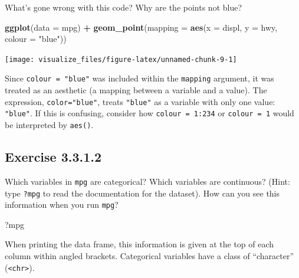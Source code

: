 \documentclass[]{book}
\newenvironment{Shaded}{\begin{snugshade}}{\end{snugshade}}
\newcommand{\DataTypeTok}[1]{\textcolor[rgb]{0.13,0.29,0.53}{#1}}
\newcommand{\KeywordTok}[1]{\textcolor[rgb]{0.13,0.29,0.53}{\textbf{#1}}}
\newcommand{\NormalTok}[1]{#1}
\newcommand{\OperatorTok}[1]{\textcolor[rgb]{0.81,0.36,0.00}{\textbf{#1}}}
\newcommand{\StringTok}[1]{\textcolor[rgb]{0.31,0.60,0.02}{#1}}
\theoremstyle{plain}
\theoremstyle{remark}
\begin{document}
What's gone wrong with this code? Why are the points not blue?

\begin{Shaded}
\begin{Highlighting}[]
\KeywordTok{ggplot}\NormalTok{(}\DataTypeTok{data =}\NormalTok{ mpg) }\OperatorTok{+}
\StringTok{  }\KeywordTok{geom_point}\NormalTok{(}\DataTypeTok{mapping =} \KeywordTok{aes}\NormalTok{(}\DataTypeTok{x =}\NormalTok{ displ, }\DataTypeTok{y =}\NormalTok{ hwy, }\DataTypeTok{colour =} \StringTok{"blue"}\NormalTok{))}
\end{Highlighting}
\end{Shaded}

\begin{center}\texttt{[image: visualize\_files/figure-latex/unnamed-chunk-9-1]} \end{center}

Since \texttt{colour\ =\ "blue"} was included within the \texttt{mapping} argument, it was treated as an aesthetic (a mapping between a variable and a value).
The expression, \texttt{color="blue"}, treats \texttt{"blue"} as a variable with only one value: \texttt{"blue"}. If this is confusing, consider how \texttt{colour\ =\ 1:234} or \texttt{colour\ =\ 1} would be interpreted by \texttt{aes()}.

\hypertarget{exercise-3.3.1.2}{%
\subsection*{\texorpdfstring{Exercise {3.3.1.2}}{Exercise 3.3.1.2}}\label{exercise-3.3.1.2}}

Which variables in \texttt{mpg} are categorical?
Which variables are continuous?
(Hint: type \texttt{?mpg} to read the documentation for the dataset).
How can you see this information when you run \texttt{mpg}?

\begin{Shaded}
\begin{Highlighting}[]
\NormalTok{?mpg}
\end{Highlighting}
\end{Shaded}

When printing the data frame, this information is given at the top of each column within angled brackets. Categorical variables have a class of ``character'' (\texttt{\textless{}chr\textgreater{}}).
\end{document}
